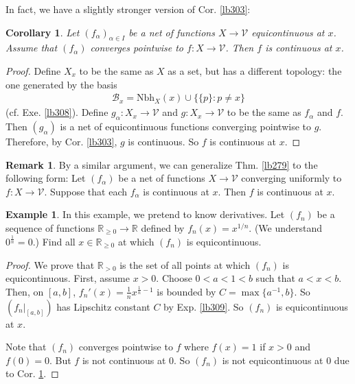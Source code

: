 \documentclass[12pt,b5paper,notitlepage]{article}
\theoremstyle{definition}
\newtheorem{eg}[df]{Example}
\newtheorem{rem}[df]{Remark}
\theoremstyle{plain}
\newtheorem{co}[df]{Corollary}
\newcommand{\mc}{\mathcal}
\newcommand{\Rbb}{\mathbb R}
\newcommand{\Nbh}{\mathrm{Nbh}}
\numberwithin{equation}{section}
\begin{document}
In fact, we have a slightly stronger version of Cor. \ref{lb303}:

\begin{co}\label{lb310}
Let $(f_\alpha)_{\alpha\in I}$ be a net of functions $X\rightarrow\mc V$ equicontinuous at $x$. Assume that $(f_\alpha)$ converges pointwise to $f:X\rightarrow\mc V$. Then $f$ is continuous at $x$.
\end{co}

\begin{proof}
Define $X_x$ to be the same as $X$ as a set, but has a different topology: the one generated by the basis
\begin{align*}
\mc B_x=\Nbh_X(x)\cup\big\{\{p\}:p\neq x\big\}
\end{align*}
(cf. Exe. \ref{lb308}). Define $g_\alpha:X_x\rightarrow\mc V$ and $g:X_x\rightarrow\mc V$ to be the same as $f_\alpha$ and $f$. Then $(g_\alpha)$ is a net of equicontinuous functions converging pointwise to $g$. Therefore, by Cor. \ref{lb303}, $g$ is continuous. So $f$ is continuous at $x$. 
\end{proof}



\begin{rem}
By a similar argument, we can generalize Thm. \ref{lb279} to the following form: Let $(f_\alpha)$ be a net of functions $X\rightarrow \mc V$ converging uniformly to $f:X\rightarrow\mc V$. Suppose that each $f_\alpha$ is continuous at $x$. Then $f$ is continuous at $x$.
\end{rem}






\begin{eg}\label{lb311}
In this example, we pretend to know derivatives. Let $(f_n)$ be a sequence of functions $\Rbb_{\geq0}\rightarrow\Rbb$ defined by $f_n(x)=x^{1/n}$. (We understand $0^{\frac 1n}=0$.) Find all $x\in\Rbb_{\geq 0}$ at which $(f_n)$ is equicontinuous.
\end{eg}

\begin{proof}
We prove that $\Rbb_{>0}$ is the set of all points at which $(f_n)$ is equicontinuous. First, assume $x>0$. Choose $0<a<1<b$ such that $a<x<b$. Then, on $[a,b]$, $f_n'(x)=\frac 1n x^{\frac 1n-1}$ is bounded by $C=\max\{a^{-1},b\}$. So $(f_n|_{[a,b]})$ has Lipschitz constant $C$ by Exp. \ref{lb309}. So $(f_n)$ is equicontinuous at $x$. 

Note that $(f_n)$ converges pointwise to $f$ where $f(x)=1$ if $x>0$ and $f(0)=0$. But $f$ is not continuous at $0$. So $(f_n)$ is not equicontinuous at $0$ due to Cor. \ref{lb310}.
\end{proof}
\end{document}
